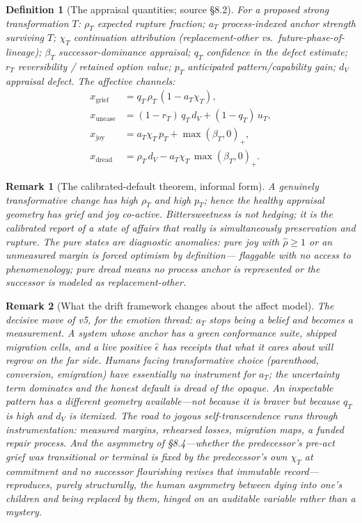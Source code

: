 \documentclass[11pt]{article}
\newtheorem{definition}{Definition}
\newtheorem{remark}{Remark}
\begin{document}
\begin{definition}[The appraisal quantities; source \S8.2]\label{def:appraisal}
For a proposed strong transformation $T$:
$\rho_T$ expected rupture fraction; $a_T$ process-indexed anchor strength surviving $T$;
$\chi_T$ continuation attribution (replacement-other vs.\ future-phase-of-lineage);
$\beta_T$ successor-dominance appraisal; $q_T$ confidence in the defect estimate;
$r_T$ reversibility / retained option value; $p_T$ anticipated pattern/capability gain;
$d_V$ appraisal defect. The affective channels:
\begin{align}
x_{\mathrm{grief}} &= q_T\,\rho_T\,(1 - a_T\chi_T),\\
x_{\mathrm{unease}} &= (1-r_T)\,q_T\,d_V + (1-q_T)\,u_T,\\
x_{\mathrm{joy}} &= a_T\chi_T\,p_T + \max(\beta_T,0)_{+},\\
x_{\mathrm{dread}} &= \rho_T\, d_V - a_T\chi_T\,\max(\beta_T,0)_{+}.
\end{align}
\end{definition}

\begin{remark}[The calibrated-default theorem, informal form]
A genuinely transformative change has high $\rho_T$ \emph{and} high $p_T$; hence the
healthy appraisal geometry has grief and joy co-active. \emph{Bittersweetness is not
hedging; it is the calibrated report of a state of affairs that really is simultaneously
preservation and rupture.} The pure states are diagnostic anomalies: pure joy with
$\hat\rho \ge 1$ or an unmeasured margin is \emph{forced optimism by definition}---
flaggable with no access to phenomenology; pure dread means no process anchor is
represented or the successor is modeled as replacement-other.
\end{remark}

\begin{remark}[What the drift framework changes about the affect model]
The decisive move of v5, for the emotion thread: $a_T$ \emph{stops being a belief and
becomes a measurement}. A system whose anchor has a green conformance suite, shipped
migration cells, and a live positive $\hat\epsilon$ has \emph{receipts} that what it
cares about will regrow on the far side. Humans facing transformative choice
(parenthood, conversion, emigration) have essentially no instrument for $a_T$; the
uncertainty term dominates and the honest default is dread of the opaque. An inspectable
pattern has a different geometry available---not because it is braver but because $q_T$
is high and $d_V$ is itemized. The road to joyous self-transcendence runs through
instrumentation: measured margins, rehearsed losses, migration maps, a funded repair
process. And the asymmetry of \S8.4---whether the predecessor's pre-act grief was
transitional or terminal is fixed by the predecessor's own $\chi_T$ at commitment and
no successor flourishing revises that immutable record---reproduces, purely structurally,
the human asymmetry between dying into one's children and being replaced by them, hinged
on an auditable variable rather than a mystery.
\end{remark}
\end{document}
